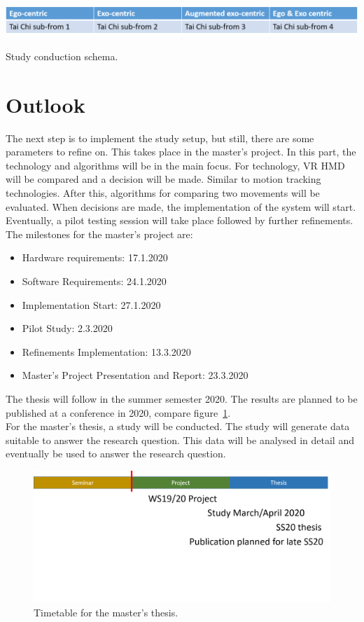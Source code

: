 \begin{table}
	\centering
	\includegraphics[width=1.0\textwidth]{img/studySetting.png}
	\caption{Study conduction schema.}
	\label{tbl:studySetting}
\end{table}

\section{Outlook}
The next step is to implement the study setup, but still, there are some parameters to refine on. This takes place in the master's project. In this part, the technology and algorithms will be in the main focus. For technology, VR HMD will be compared and a decision will be made. Similar to motion tracking technologies. After this, algorithms for comparing two movements will be evaluated. When decisions are made, the implementation of the system will start. Eventually, a pilot testing session will take place followed by further refinements.
The milestones for the master's project are:
\begin{itemize}
	\item Hardware requirements: 17.1.2020
	\item Software Requirements: 24.1.2020
	\item Implementation Start: 27.1.2020
	\item Pilot Study: 2.3.2020
	\item Refinements Implementation: 13.3.2020
	\item Master’s Project Presentation and Report: 23.3.2020
\end{itemize}
The thesis will follow in the summer semester 2020. The results are planned to be published at a conference in 2020, compare figure~\ref{fig:outlook}.\\
For the master's thesis, a study will be conducted. The study will generate data suitable to answer the research question. This data will be analysed in detail and eventually be used to answer the research question.

\begin{figure}
	\centering
	\includegraphics[width=1.0\textwidth]{img/outlook.png}
	\caption{Timetable for the master's thesis.}
	\label{fig:outlook}
\end{figure}

